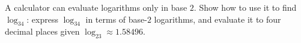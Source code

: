 A calculator can evaluate logarithms only in base $2$. Show how to use it to find $\log_34$: express $\log_34$ in terms of base-$2$ logarithms, and evaluate it to four decimal places given $\log_23\approx1.58496$.
